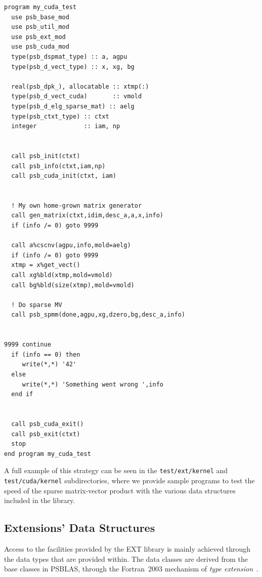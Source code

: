 \begin{center}
    \begin{minipage}[tl]{0.9\textwidth}
\begin{verbatim} 
program my_cuda_test
  use psb_base_mod
  use psb_util_mod 
  use psb_ext_mod
  use psb_cuda_mod
  type(psb_dspmat_type) :: a, agpu
  type(psb_d_vect_type) :: x, xg, bg

  real(psb_dpk_), allocatable :: xtmp(:)
  type(psb_d_vect_cuda)       :: vmold
  type(psb_d_elg_sparse_mat) :: aelg
  type(psb_ctxt_type) :: ctxt
  integer             :: iam, np


  call psb_init(ctxt)
  call psb_info(ctxt,iam,np)
  call psb_cuda_init(ctxt, iam)

  
  ! My own home-grown matrix generator
  call gen_matrix(ctxt,idim,desc_a,a,x,info)
  if (info /= 0) goto 9999

  call a%cscnv(agpu,info,mold=aelg)
  if (info /= 0) goto 9999
  xtmp = x%get_vect() 
  call xg%bld(xtmp,mold=vmold)
  call bg%bld(size(xtmp),mold=vmold)
  
  ! Do sparse MV
  call psb_spmm(done,agpu,xg,dzero,bg,desc_a,info)

 
9999 continue
  if (info == 0) then 
     write(*,*) '42'
  else
     write(*,*) 'Something went wrong ',info
  end if
  
  
  call psb_cuda_exit()
  call psb_exit(ctxt)
  stop
end program my_cuda_test
\end{verbatim}
    \end{minipage}
  \end{center}
\fi
      
A full example of this strategy can be seen in the
\texttt{test/ext/kernel} and \texttt{test/\-cuda/\-kernel} subdirectories,
where we provide  sample programs 
to test the speed of the sparse matrix-vector product with the various
data structures included in the library. 


\subsection{Extensions' Data Structures}
\label{sec:ext-datastruct}

Access to the facilities provided by the EXT library is mainly
achieved through the data types that are provided within. 
The data classes are derived from the base  classes in PSBLAS, through 
the Fortran~2003 mechanism of \emph{type extension}~\cite{MRC:11}.  

